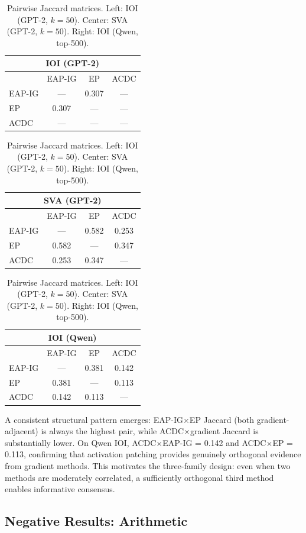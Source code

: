 \documentclass[11pt]{article}
\begin{document}
\begin{table}[t]
\centering
\caption{Pairwise Jaccard matrices. Left: IOI (GPT-2, $k=50$). Center: SVA (GPT-2, $k=50$). Right: IOI (Qwen, top-500).}
\label{tab:jaccard_matrices}
\small
\begin{tabular}{l|ccc}
\multicolumn{4}{c}{\textbf{IOI (GPT-2)}} \\
\toprule
 & EAP-IG & EP & ACDC \\
\midrule
EAP-IG & --- & 0.307 & --- \\
EP & 0.307 & --- & --- \\
ACDC & --- & --- & --- \\
\bottomrule
\end{tabular}
\quad
\begin{tabular}{l|ccc}
\multicolumn{4}{c}{\textbf{SVA (GPT-2)}} \\
\toprule
 & EAP-IG & EP & ACDC \\
\midrule
EAP-IG & --- & 0.582 & 0.253 \\
EP & 0.582 & --- & 0.347 \\
ACDC & 0.253 & 0.347 & --- \\
\bottomrule
\end{tabular}
\quad
\begin{tabular}{l|ccc}
\multicolumn{4}{c}{\textbf{IOI (Qwen)}} \\
\toprule
 & EAP-IG & EP & ACDC \\
\midrule
EAP-IG & --- & 0.381 & 0.142 \\
EP & 0.381 & --- & 0.113 \\
ACDC & 0.142 & 0.113 & --- \\
\bottomrule
\end{tabular}
\end{table}

A consistent structural pattern emerges: EAP-IG$\times$EP Jaccard (both gradient-adjacent) is always the highest pair, while ACDC$\times$gradient Jaccard is substantially lower. On Qwen IOI, ACDC$\times$EAP-IG = 0.142 and ACDC$\times$EP = 0.113, confirming that activation patching provides genuinely orthogonal evidence from gradient methods. This motivates the three-family design: even when two methods are moderately correlated, a sufficiently orthogonal third method enables informative consensus.

\subsection{Negative Results: Arithmetic}
\label{sec:arithmetic}
\end{document}
